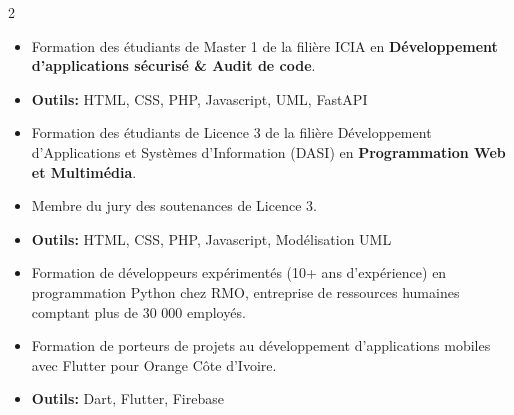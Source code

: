 \documentclass[10pt,a4paper,ragged2e,withhyper]{altacv}
\begin{document}
\begin{paracol}{2}
            \begin{itemize}
                \item Formation des étudiants de Master 1 de la filière ICIA en {\textbf{Développement d'applications sécurisé \& Audit de code}}.
                \item \textcolor{SecondaryColor}{\textbf{Outils: }} HTML, CSS, PHP, Javascript, UML, FastAPI
            \end{itemize}
            \divider

            \begin{itemize}
                \item Formation des étudiants de Licence 3 de la filière Développement d'Applications et Systèmes d'Information (DASI) en {\textbf{Programmation Web et Multimédia}}.
                \item Membre du jury des soutenances de Licence 3.
                \item \textcolor{SecondaryColor}{\textbf{Outils: }} HTML, CSS, PHP, Javascript, Modélisation UML
            \end{itemize}
            \divider

            \begin{itemize}
                \item Formation de développeurs expérimentés (10+ ans d'expérience) en programmation Python chez RMO, entreprise de ressources humaines comptant plus de 30 000 employés.
            \end{itemize}
            \divider

            \begin{itemize}
                \item Formation de porteurs de projets au développement d'applications mobiles avec Flutter pour Orange Côte d'Ivoire.
                \item \textcolor{SecondaryColor}{\textbf{Outils: }} Dart, Flutter, Firebase
            \end{itemize}


\end{paracol}
\end{document}

